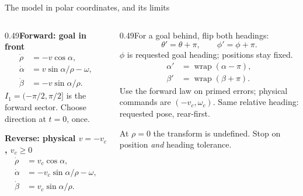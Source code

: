 \documentclass[aspectratio=169]{beamer}
\begin{document}
\begin{frame}[t]{The model in polar coordinates, and its limits}
\small
\setlength{\abovedisplayskip}{1mm}\setlength{\belowdisplayskip}{1mm}
\setlength{\abovedisplayshortskip}{0pt}\setlength{\belowdisplayshortskip}{0pt}
\begin{columns}[T,onlytextwidth]\begin{column}{0.49\textwidth}\textbf{Forward: goal in front}\[\begin{aligned}\dot\rho&=-v\cos\alpha,\\\dot\alpha&=v\sin\alpha/\rho-\omega,\\\dot\beta&=-v\sin\alpha/\rho.\end{aligned}\]$I_1=(-\pi/2,\pi/2]$ is the forward sector. Choose direction at $t=0$, once.\par\vspace{2mm}\textbf{Reverse: physical $v=-v_c$, $v_c\geq0$}\[\begin{aligned}\dot\rho&=v_c\cos\alpha,\\\dot\alpha&=-v_c\sin\alpha/\rho-\omega,\\\dot\beta&=v_c\sin\alpha/\rho.\end{aligned}\]\end{column}\begin{column}{0.49\textwidth}For a goal behind, flip both headings:\[\theta\prime=\theta+\pi,\qquad\phi\prime=\phi+\pi.\]$\phi$ is requested goal heading; positions stay fixed.\[\begin{aligned}\alpha\prime&=\operatorname{wrap}(\alpha-\pi),\\\beta\prime&=\operatorname{wrap}(\beta+\pi).\end{aligned}\]Use the forward law on primed errors; physical commands are $(-v_c,\omega_c)$. Same relative heading: requested pose, rear-first.\par\vspace{2mm}At $\rho=0$ the transform is undefined. Stop on position \emph{and} heading tolerance.\end{column}\end{columns}
\end{frame}
\end{document}

